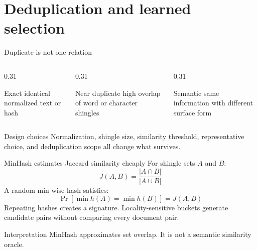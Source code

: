 \documentclass[handout]{beamer}
\begin{document}
\section{Deduplication and learned selection}

\begin{frame}{Duplicate is not one relation}
  \begin{columns}[t]
    \begin{column}{0.31\linewidth}
      \begin{block}{Exact}
        identical normalized text or hash
      \end{block}
    \end{column}
    \begin{column}{0.31\linewidth}
      \begin{block}{Near duplicate}
        high overlap of word or character shingles
      \end{block}
    \end{column}
    \begin{column}{0.31\linewidth}
      \begin{block}{Semantic}
        same information with different surface form
      \end{block}
    \end{column}
  \end{columns}
  \vfill
  \begin{alertblock}{Design choices}
    Normalization, shingle size, similarity threshold, representative choice, and deduplication scope all change what survives.
  \end{alertblock}
\end{frame}

\begin{frame}{MinHash estimates Jaccard similarity cheaply}
  For shingle sets $A$ and $B$:
  \[
    J(A,B)=\frac{|A\cap B|}{|A\cup B|}
  \]
  A random min-wise hash satisfies:
  \[
    \Pr[\min h(A)=\min h(B)]=J(A,B)
  \]
  Repeating hashes creates a signature. Locality-sensitive buckets generate candidate pairs without comparing every document pair.
  \begin{block}{Interpretation}
    MinHash approximates set overlap. It is not a semantic similarity oracle.
  \end{block}
\end{frame}
\end{document}
